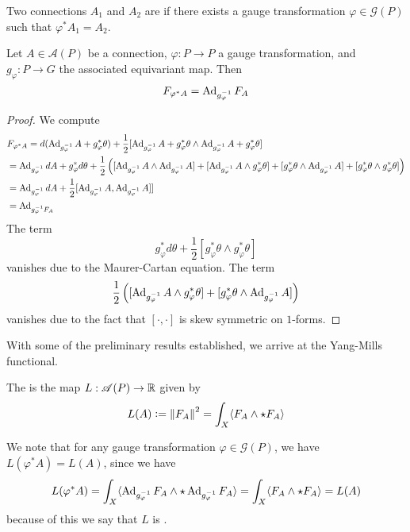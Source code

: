 %
\begin{defn}
Two connections $A_1$ and $A_2$ are  if there exists
a gauge transformation $\varphi \in \mathscr{G}(P)$ such that $\varphi^*A_1 = A_2$.
\end{defn}
%
\begin{prop}
Let $A \in \mathscr{A}(P)$ be a connection, $\varphi : P \to P$ a gauge
transformation, and $g_\varphi : P \to G$ the associated equivariant map.
Then
\[
F_{\varphi^*A} = \operatorname{Ad}_{g_\varphi^{-1}}F_A
\]
\end{prop}
%
\begin{proof}
We compute
\begin{align*}
&F_{\varphi^*A} = d(\operatorname{Ad}_{g_\varphi^{-1}} A + g_\varphi^*\theta)
+ \frac{1}{2}[\operatorname{Ad}_{g_\varphi^{-1}} A + g_\varphi^*\theta\wedge
\operatorname{Ad}_{g_\varphi^{-1}} A + g_\varphi^*\theta] \\
&= \operatorname{Ad}_{g_\varphi^{-1}}dA + g_\varphi^*d\theta + \frac{1}{2}
\left([\operatorname{Ad}_{g_\varphi^{-1}}A\wedge \operatorname{Ad}_{g_\varphi^{-1}} A] + [\operatorname{Ad}_{g_\varphi^{-1}} A\wedge
g_\varphi^*\theta] + [g^*_\varphi\theta\wedge \operatorname{Ad}_{g_\varphi^{-1}}A]
+ [g_\varphi^*\theta\wedge g_\varphi^*\theta] \right) \\
&= \operatorname{Ad}_{g_\varphi^{-1}} dA + \frac{1}{2}[\operatorname{Ad}_{g_\varphi^{-1}}A, \operatorname{Ad}_{g_\varphi^{-1}} A]] \\
&= \operatorname{Ad}_{g_\varphi^{-1} F_A}
\end{align*}
%
The term
\[
g_\varphi^*d\theta + \frac{1}{2}[g_\varphi^*\theta\wedge g_\varphi^*\theta]
\]
vanishes due to the Maurer-Cartan equation. The term
\[
\frac{1}{2}\left([\operatorname{Ad}_{g_\varphi^{-1}} A\wedge
g_\varphi^*\theta] + [g^*_\varphi\theta\wedge \operatorname{Ad}_{g_\varphi^{-1}}A]\right)
\]
vanishes due to the fact that $[\cdot,\cdot]$ is skew symmetric on $1$-forms.
\end{proof}
%
With some of the preliminary results established, we arrive at the Yang-Mills
functional.
%
\begin{defn}
The  is the map $L : \mathscr{A}(P) \to \mathbb{R}$ given by
\[
L(A) \vcentcolon= \left\lVert F_A\right\rVert^2 = \int_X \langle F_A\wedge\star F_A\rangle
\]
\end{defn}
%
We note that for any gauge transformation $\varphi \in \mathscr{G}(P)$,
we have $L(\varphi^*A) = L(A)$, since we have
\[
L(\varphi^*A)
= \int_X\langle \operatorname{Ad}_{g_\varphi^{-1}}F_A\wedge\star\operatorname{Ad}_{g_\varphi^{-1}}F_A\rangle
= \int_X\langle F_A\wedge\star F_A\rangle = L(A)
\]
because of this we say that $L$ is . \\

